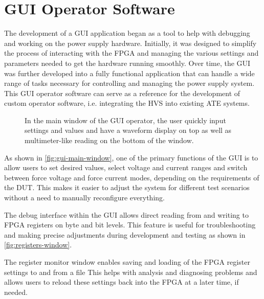 

\section{\acs{GUI} Operator Software}
\label{sec:gui-operator-software}

The development of a \acs{GUI} application began as a tool to help with
debugging and working on the power supply hardware.
Initially, it was designed to simplify the process of interacting with the
FPGA and managing the various settings and parameters needed to get the
hardware running smoothly.
Over time, the \acs{GUI} was further developed
into a fully functional application that can handle a wide range of tasks
necessary for controlling and managing
the power supply system.
This \acs{GUI} operator software can serve as a reference for the development of
custom operator software, i.e. integrating the \acs{HVS} into
existing \acs{ATE} systems.

\begin{figure}[htbp]
    \centering
    \caption[GUI Operator Main Window]{
        In the main window of the GUI operator, the user quickly input
        settings and values and have a waveform display on top as well as
        multimeter-like reading on the bottom of the window.
    }
    \label{fig:gui-main-window}
\end{figure}

As shown in \autoref{fig:gui-main-window}, one of the primary functions of the
GUI is to allow users to set desired values,
select voltage and current ranges and switch between force voltage and force
current modes, depending on the requirements of the \acs{DUT}.
This makes it easier to adjust the system for different test scenarios
without a need to manually reconfigure everything.

The debug interface within the GUI allows direct reading from and writing to
FPGA registers on byte and bit levels.
This feature is useful for troubleshooting and making precise
adjustments during development and testing as shown in
\autoref{fig:registers-window}.

The register monitor window enables saving and loading of the
FPGA register settings to and from a file
This helps with analysis and diagnosing problems and allows users to reload
these settings back into the FPGA at a later time, if needed.

